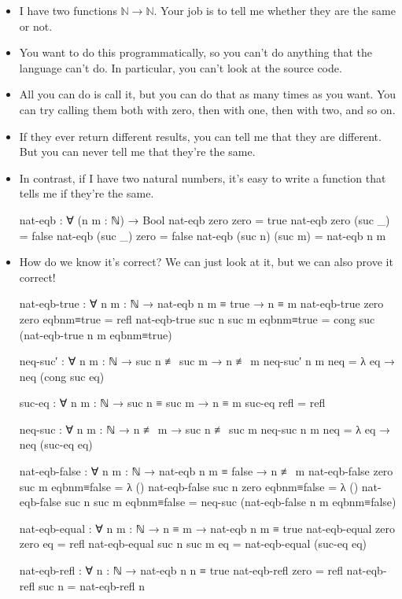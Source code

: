 \documentclass{lecturenotes}
\begin{document}
\begin{itemize}
\item I have two functions $\mathbb{N} \to \mathbb{N}$.
  Your job is to tell me whether they are the same or not.
\item You want to do this programmatically, so you can't do anything that the language can't do.
  In particular, you can't look at the source code.
\item All you can do is call it, but you can do that as many times as you want.
  You can try calling them both with zero, then with one, then with two, and so on.
\item If they ever return different results, you can tell me that they are different.
  But you can never tell me that they're the same.
\item In contrast, if I have two natural numbers, it's easy to write a function that tells me if they're the same.
\begin{code}
nat-eqb : ∀ (n m : ℕ) → Bool
nat-eqb zero zero = true
nat-eqb zero (suc _) = false
nat-eqb (suc _) zero = false
nat-eqb (suc n) (suc m) = nat-eqb n m
\end{code}
\item How do we know it's correct?
  We can just look at it, but we can also prove it correct!
\begin{code}
nat-eqb-true : ∀ {n m : ℕ} → nat-eqb n m ≡ true → n ≡ m
nat-eqb-true {zero} {zero} eqbnm≡true = refl
nat-eqb-true {suc n} {suc m} eqbnm≡true  = cong suc (nat-eqb-true {n} {m} eqbnm≡true)

neq-suc′ : ∀ {n m : ℕ} → suc n ≢ suc m → n ≢ m
neq-suc′ {n} {m} neq = λ eq → neq (cong suc eq)

suc-eq : ∀ {n m : ℕ} → suc n ≡ suc m → n ≡ m
suc-eq refl = refl

neq-suc : ∀ {n m : ℕ} → n ≢ m → suc n ≢ suc m
neq-suc {n} {m} neq = λ {eq → neq (suc-eq eq)} 

nat-eqb-false : ∀ {n m : ℕ} → nat-eqb n m ≡ false → n ≢ m
nat-eqb-false {zero} {suc m} eqbnm≡false = λ ()
nat-eqb-false {suc n} {zero} eqbnm≡false = λ () 
nat-eqb-false {suc n} {suc m} eqbnm≡false = neq-suc (nat-eqb-false {n} {m} eqbnm≡false)

nat-eqb-equal : ∀ {n m : ℕ} → n ≡ m → nat-eqb n m ≡ true
nat-eqb-equal {zero} {zero} eq = refl
nat-eqb-equal {suc n} {suc m} eq = nat-eqb-equal (suc-eq eq)

nat-eqb-refl : ∀ {n : ℕ} → nat-eqb n n ≡ true
nat-eqb-refl {zero} = refl
nat-eqb-refl {suc n} = nat-eqb-refl {n}


\end{code}
\end{itemize}
\end{document}
